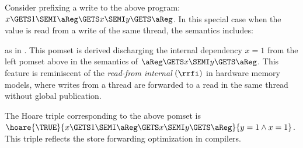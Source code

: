 Consider prefixing a write to the above program:
\begin{math}
  x \GETS 1 \SEMI
  \aReg\GETS x\SEMI
  y\GETS \aReg
\end{math}.
In this special case when the value is read from a write of the same thread, the semantics includes:
\begin{tikzdisplay}[node distance=1em]
\end{tikzdisplay}
as in \citep{2019-sp}.  This pomset is derived discharging the internal
dependency $x=1$ from the left pomset above in the semantics of
$\aReg\GETS x\SEMI y\GETS \aReg$.  This feature is reminiscent of the
\emph{read-from internal} $({\rrfi})$ in hardware memory models, where writes
from a thread are forwarded to a read in the same thread without global
publication.

The Hoare triple corresponding to the above pomset is
$\hoare{\TRUE}{x \GETS 1\SEMI \aReg \GETS x \SEMI y\GETS \aReg}{y =1\land x=1}$.
This triple reflects the store forwarding optimization in compilers.

